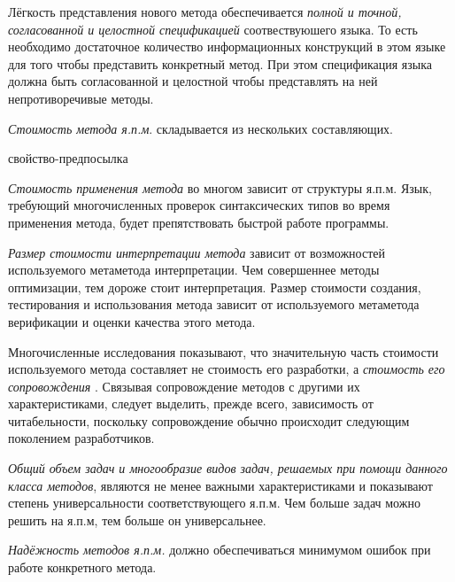 Лёгкость представления нового метода обеспечивается\textit{ полной и точной, согласованной и целостной спецификацией} соотвествуюшего языка. То есть необходимо достаточное количество информационных конструкций в этом языке для того чтобы представить конкретный метод. При этом спецификация языка должна быть согласованной и целостной чтобы представлять на ней непротиворечивые методы.

\textit{Стоимость метода я.п.м}. складывается из нескольких составляющих.

\begin{SCn}
\begin{scnrelfromlist}{свойство-предпосылка}
\end{scnrelfromlist}
\end{SCn}

\textit{Стоимость применения метода} во многом зависит от структуры я.п.м. Язык, требующий многочисленных проверок синтаксических типов во время применения метода, будет препятствовать быстрой работе программы.

\textit{Размер стоимости интерпретации метода} зависит от возможностей используемого метаметода интерпретации. Чем совершеннее методы оптимизации, тем дороже стоит интерпретация.
Размер стоимости создания, тестирования и использования метода зависит от используемого метаметода верификации и оценки качества этого метода.

Многочисленные исследования показывают, что значительную часть стоимости используемого метода составляет не стоимость его разработки, а \textit{стоимость его сопровождения} \cite{Brooks2021}. Связывая сопровождение методов с другими их характеристиками, следует выделить, прежде всего, зависимость от читабельности, поскольку сопровождение обычно происходит следующим поколением разработчиков.

\textit{Общий объем задач и многообразие видов задач, решаемых при помощи данного класса методов}, являются не менее важными характеристиками и показывают степень универсальности соответствующего я.п.м. Чем больше задач можно решить на я.п.м, тем больше он универсальнее.

\textit{Надёжность методов я.п.м.} должно обеспечиваться минимумом ошибок при работе конкретного метода.

